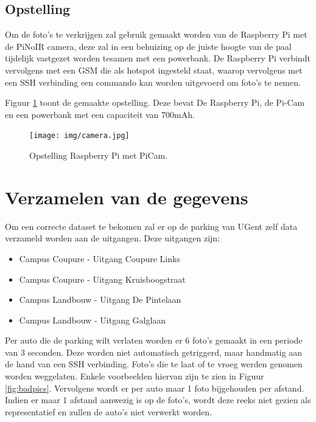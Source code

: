 \subsection{Opstelling}
Om de foto's te verkrijgen zal gebruik gemaakt worden van de Raspberry Pi met de PiNoIR camera, deze zal in een behuizing op de juiste hoogte van de paal tijdelijk vastgezet worden tesamen met een powerbank. De Raspberry Pi verbindt vervolgens met een GSM die als hotspot ingesteld staat, waarop vervolgens met een SSH verbinding een commando kan worden uitgevoerd om foto's te nemen.

Figuur \ref{Opstelling} toont de gemaakte opstelling. Deze bevat De Raspberry Pi, de Pi-Cam en een powerbank met een capaciteit van 700mAh.
\begin{figure}[h]
	\centering
	\texttt{[image: img/camera.jpg]}
	\caption{Opstelling Raspberry Pi met PiCam.}
	\label{Opstelling}
\end{figure}

\section{Verzamelen van de gegevens}

Om een correcte dataset te bekomen zal er op de parking van UGent zelf data verzameld worden aan de uitgangen.
Deze uitgangen zijn:
\begin{itemize}
	\item Campus Coupure - Uitgang Coupure Links
	\item Campus Coupure - Uitgang Kruisboogstraat
	\item Campus Landbouw - Uitgang De Pintelaan
	\item Campus Landbouw - Uitgang Galglaan
\end{itemize}

Per auto die de parking wilt verlaten worden er 6 foto's gemaakt in een periode van 3 seconden. Deze worden niet automatisch getriggerd, maar handmatig aan de hand van een SSH verbinding. Foto's die te laat of te vroeg werden genomen worden weggelaten. Enkele voorbeelden hiervan zijn te zien in Figuur \ref{fig:badpics}. Vervolgens wordt er per auto maar 1 foto bijgehouden per afstand. Indien er maar 1 afstand aanwezig is op de foto's, wordt deze reeks niet gezien als representatief en zullen de auto's niet verwerkt worden.

